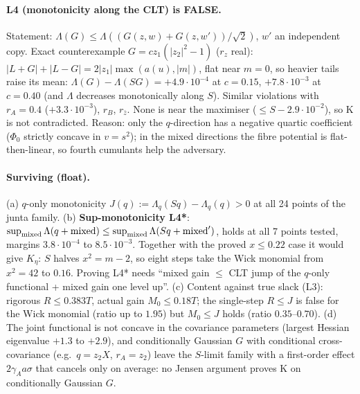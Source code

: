 \paragraph{L4 (monotonicity along the CLT) is FALSE.} Statement: $\Lambda(G)\le\Lambda((G(z,w)+G(z,w'))/\sqrt2)$, $w'$ an independent copy. Exact counterexample
$G=cz_1(|z_2|^2-1)$ ($r_z$ real): $|L+G|+|L-G|=2|z_1|\max(a(u),|m|)$, flat near $m=0$, so heavier tails raise its mean: $\Lambda(G)-\Lambda(SG)=+4.9\cdot10^{-4}$ at $c=0.15$,
$+7.8\cdot10^{-3}$ at $c=0.40$ (and $\Lambda$ decreases monotonically along $S$). Similar violations with $r_A=0.4$ ($+3.3\cdot10^{-3}$), $r_B$, $r_{\bar z}$. None is near the
maximiser ($\le S-2.9\cdot10^{-2}$), so K is not contradicted. Reason: only the $q$-direction has a negative quartic coefficient ($\Phi_0$ strictly concave in $v=s^2$);
in the mixed directions the fibre potential is flat-then-linear, so fourth cumulants help the adversary.
\paragraph{Surviving (float).} (a) $q$-only monotonicity $J(q):=\Lambda_q(Sq)-\Lambda_q(q)>0$ at all 24 points of the junta family. (b) \textbf{Sup-monotonicity L4*}:
$\sup_{\rm mixed}\Lambda(q+\text{mixed})\le\sup_{\rm mixed}\Lambda(Sq+\text{mixed}')$, holds at all 7 points tested, margins $3.8\cdot10^{-4}$ to $8.5\cdot10^{-3}$. Together with the
proved $x\le0.22$ case it would give $K_\eta$: $S$ halves $x^2=m-2$, so eight steps take the Wick monomial from $x^2=42$ to $0.16$. Proving L4* needs ``mixed gain $\le$
CLT jump of the $q$-only functional + mixed gain one level up''. (c) Content against true slack (L3): rigorous $R\le0.383T$, actual gain $M_0\le0.18T$; the single-step
$R\le J$ is false for the Wick monomial (ratio up to $1.95$) but $M_0\le J$ holds (ratio $0.35$--$0.70$). (d) The joint functional is not concave in the covariance
parameters (largest Hessian eigenvalue $+1.3$ to $+2.9$), and conditionally Gaussian $G$ with conditional cross-covariance (e.g.\ $q=z_2X$, $r_A=z_2$) leave the
$S$-limit family with a first-order effect $2\gamma_Aa\sigma$ that cancels only on average: no Jensen argument proves K on conditionally Gaussian $G$.
